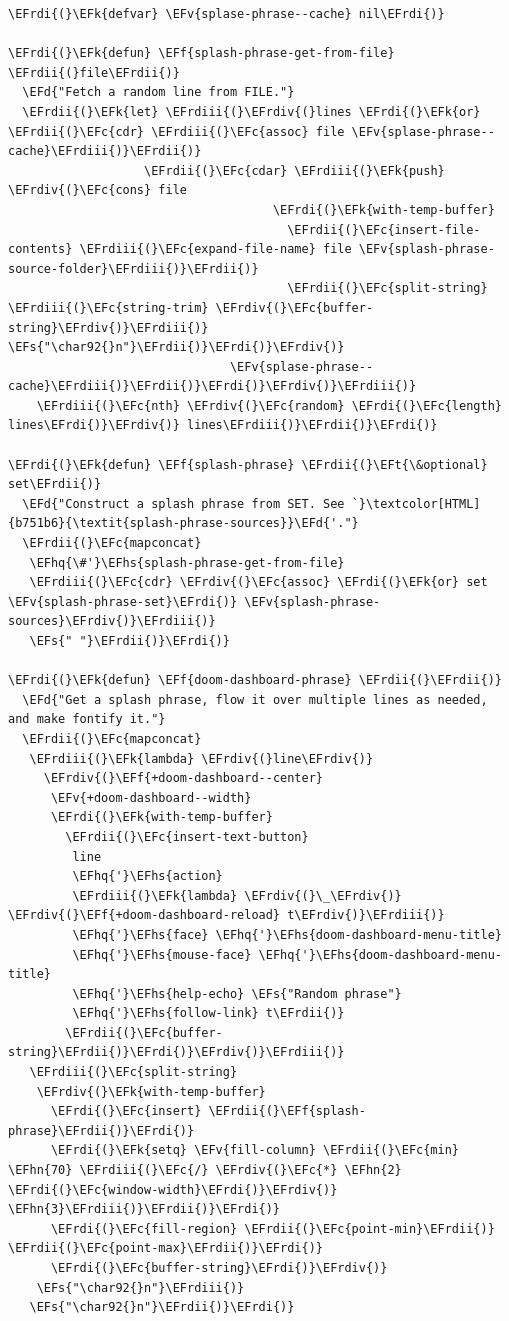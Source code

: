 \documentclass{scrartcl}
\newcommand{\EFk}[1]{\textcolor{EFk}{#1}} %
\newcommand{\EFd}[1]{\textcolor{EFd}{\textit{#1}}} %
\newcommand{\EFt}[1]{\textcolor{EFt}{#1}} %
\newcommand{\EFs}[1]{\textcolor{EFs}{#1}} %
\newcommand{\EFc}[1]{\textcolor{EFc}{#1}} %
\newcommand{\EFv}[1]{\textcolor{EFv}{#1}} %
\newcommand{\EFf}[1]{\textcolor{EFf}{#1}} %
\newcommand{\EFhn}[1]{\textcolor{EFhn}{\textbf{#1}}} %
\newcommand{\EFhq}[1]{\textcolor{EFhq}{#1}} %
\newcommand{\EFhs}[1]{\textcolor{EFhs}{#1}} %
\newcommand{\EFrdi}[1]{\textcolor{EFrdi}{#1}} %
\newcommand{\EFrdii}[1]{\textcolor{EFrdii}{#1}} %
\newcommand{\EFrdiii}[1]{\textcolor{EFrdiii}{#1}} %
\newcommand{\EFrdiv}[1]{\textcolor{EFrdiv}{#1}} %
\begin{document}
\begin{Code}
\begin{Verbatim}[]
\EFrdi{(}\EFk{defvar} \EFv{splase-phrase--cache} nil\EFrdi{)}

\EFrdi{(}\EFk{defun} \EFf{splash-phrase-get-from-file} \EFrdii{(}file\EFrdii{)}
  \EFd{"Fetch a random line from FILE."}
  \EFrdii{(}\EFk{let} \EFrdiii{(}\EFrdiv{(}lines \EFrdi{(}\EFk{or} \EFrdii{(}\EFc{cdr} \EFrdiii{(}\EFc{assoc} file \EFv{splase-phrase--cache}\EFrdiii{)}\EFrdii{)}
                   \EFrdii{(}\EFc{cdar} \EFrdiii{(}\EFk{push} \EFrdiv{(}\EFc{cons} file
                                     \EFrdi{(}\EFk{with-temp-buffer}
                                       \EFrdii{(}\EFc{insert-file-contents} \EFrdiii{(}\EFc{expand-file-name} file \EFv{splash-phrase-source-folder}\EFrdiii{)}\EFrdii{)}
                                       \EFrdii{(}\EFc{split-string} \EFrdiii{(}\EFc{string-trim} \EFrdiv{(}\EFc{buffer-string}\EFrdiv{)}\EFrdiii{)} \EFs{"\char92{}n"}\EFrdii{)}\EFrdi{)}\EFrdiv{)}
                               \EFv{splase-phrase--cache}\EFrdiii{)}\EFrdii{)}\EFrdi{)}\EFrdiv{)}\EFrdiii{)}
    \EFrdiii{(}\EFc{nth} \EFrdiv{(}\EFc{random} \EFrdi{(}\EFc{length} lines\EFrdi{)}\EFrdiv{)} lines\EFrdiii{)}\EFrdii{)}\EFrdi{)}

\EFrdi{(}\EFk{defun} \EFf{splash-phrase} \EFrdii{(}\EFt{\&optional} set\EFrdii{)}
  \EFd{"Construct a splash phrase from SET. See `}\textcolor[HTML]{b751b6}{\textit{splash-phrase-sources}}\EFd{'."}
  \EFrdii{(}\EFc{mapconcat}
   \EFhq{\#'}\EFhs{splash-phrase-get-from-file}
   \EFrdiii{(}\EFc{cdr} \EFrdiv{(}\EFc{assoc} \EFrdi{(}\EFk{or} set \EFv{splash-phrase-set}\EFrdi{)} \EFv{splash-phrase-sources}\EFrdiv{)}\EFrdiii{)}
   \EFs{" "}\EFrdii{)}\EFrdi{)}

\EFrdi{(}\EFk{defun} \EFf{doom-dashboard-phrase} \EFrdii{(}\EFrdii{)}
  \EFd{"Get a splash phrase, flow it over multiple lines as needed, and make fontify it."}
  \EFrdii{(}\EFc{mapconcat}
   \EFrdiii{(}\EFk{lambda} \EFrdiv{(}line\EFrdiv{)}
     \EFrdiv{(}\EFf{+doom-dashboard--center}
      \EFv{+doom-dashboard--width}
      \EFrdi{(}\EFk{with-temp-buffer}
        \EFrdii{(}\EFc{insert-text-button}
         line
         \EFhq{'}\EFhs{action}
         \EFrdiii{(}\EFk{lambda} \EFrdiv{(}\_\EFrdiv{)} \EFrdiv{(}\EFf{+doom-dashboard-reload} t\EFrdiv{)}\EFrdiii{)}
         \EFhq{'}\EFhs{face} \EFhq{'}\EFhs{doom-dashboard-menu-title}
         \EFhq{'}\EFhs{mouse-face} \EFhq{'}\EFhs{doom-dashboard-menu-title}
         \EFhq{'}\EFhs{help-echo} \EFs{"Random phrase"}
         \EFhq{'}\EFhs{follow-link} t\EFrdii{)}
        \EFrdii{(}\EFc{buffer-string}\EFrdii{)}\EFrdi{)}\EFrdiv{)}\EFrdiii{)}
   \EFrdiii{(}\EFc{split-string}
    \EFrdiv{(}\EFk{with-temp-buffer}
      \EFrdi{(}\EFc{insert} \EFrdii{(}\EFf{splash-phrase}\EFrdii{)}\EFrdi{)}
      \EFrdi{(}\EFk{setq} \EFv{fill-column} \EFrdii{(}\EFc{min} \EFhn{70} \EFrdiii{(}\EFc{/} \EFrdiv{(}\EFc{*} \EFhn{2} \EFrdi{(}\EFc{window-width}\EFrdi{)}\EFrdiv{)} \EFhn{3}\EFrdiii{)}\EFrdii{)}\EFrdi{)}
      \EFrdi{(}\EFc{fill-region} \EFrdii{(}\EFc{point-min}\EFrdii{)} \EFrdii{(}\EFc{point-max}\EFrdii{)}\EFrdi{)}
      \EFrdi{(}\EFc{buffer-string}\EFrdi{)}\EFrdiv{)}
    \EFs{"\char92{}n"}\EFrdiii{)}
   \EFs{"\char92{}n"}\EFrdii{)}\EFrdi{)}


\end{Verbatim}
\end{Code}
\end{document}
